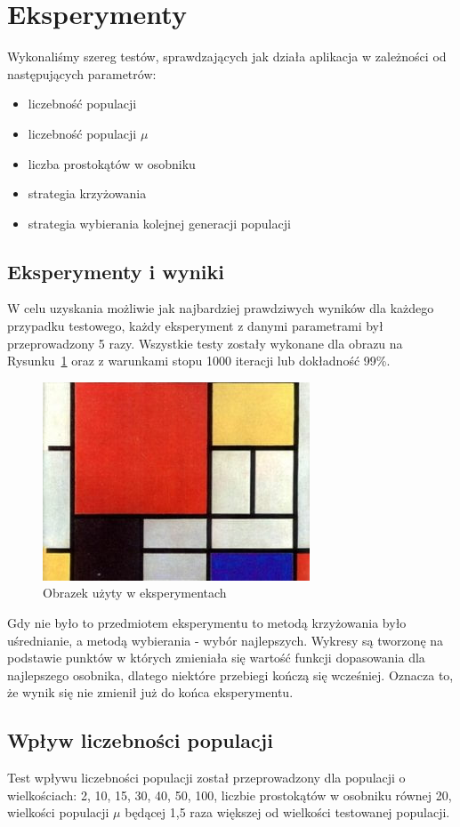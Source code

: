 \section{Eksperymenty}
Wykonaliśmy szereg testów, sprawdzających jak działa aplikacja w zależności od następujących parametrów:
\begin{itemize}
    \item liczebność populacji
    \item liczebność populacji $\mu$
    \item liczba prostokątów w osobniku
    \item strategia krzyżowania
    \item strategia wybierania kolejnej generacji populacji
\end{itemize}

\subsection{Eksperymenty i wyniki}
W celu uzyskania możliwie jak najbardziej prawdziwych wyników dla każdego przypadku testowego, każdy eksperyment z danymi parametrami był przeprowadzony 5 razy. Wszystkie testy zostały wykonane dla obrazu na Rysunku~\ref{fig:test_image} oraz z warunkami stopu 1000 iteracji lub dokładność 99\%. 
\begin{figure}[H]
    \centering \includegraphics[width=0.5\linewidth]{img/simple_img.jpg}
    \caption{Obrazek użyty w eksperymentach}
    \label{fig:test_image}
\end{figure}
Gdy nie było to przedmiotem eksperymentu to metodą krzyżowania było uśrednianie, a metodą wybierania - wybór najlepszych. Wykresy są tworzonę na podstawie punktów w których zmieniała się wartość funkcji dopasowania dla najlepszego osobnika, dlatego niektóre przebiegi kończą się wcześniej. Oznacza to, że wynik się nie zmienił już do końca eksperymentu.

\subsection*{Wpływ liczebności populacji}
Test wpływu liczebności populacji został przeprowadzony dla populacji o wielkościach: 2, 10, 15, 30, 40, 50, 100, liczbie prostokątów w osobniku równej 20, wielkości populacji $\mu$ będącej 1,5 raza większej od wielkości testowanej populacji.

